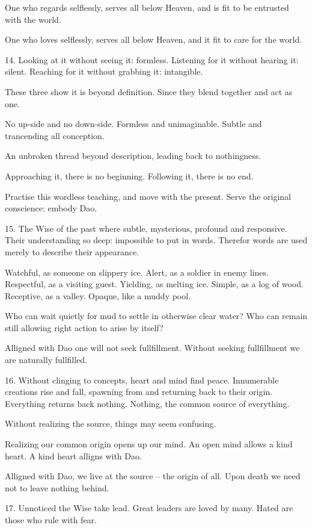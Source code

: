 \documentclass[10pt,a4paper]{book}
\begin{document}
One who regards selflessly,
serves all below Heaven,
and is fit to be entrusted with the world.

One who loves selflessly,
serves all below Heaven,
and it fit to care for the world.


14.
Looking at it without seeing it: formless.
Listening for it without hearing it: silent.
Reaching for it without grabbing it: intangible.

These three show it is beyond definition.
Since they blend together and act as one.

No up-side and no down-side.
Formless and unimaginable.
Subtle and trancending all conception.

An unbroken thread beyond description,
leading back to nothingness.

Approaching it, there is no beginning.
Following it, there is no end.

Practise this wordless teaching,
and move with the present.
Serve the original conscience: embody Dao.


15.
The Wise of the past where subtle, mysterious, profound and responsive.
Their understanding so deep: impossible to put in words.
Therefor words are used merely to describe their appearance.

Watchful, as someone on slippery ice.
Alert, as a soldier in enemy lines.
Respectful, as a visiting guest.
Yielding, as melting ice.
Simple, as a log of wood.
Receptive, as a valley.
Opaque, like a muddy pool.

Who can wait quietly for mud to settle in otherwise clear water?
Who can remain still allowing right action to arise by itself?

Alligned with Dao one will not seek fullfillment.
Without seeking fullfillment we are naturally fullfilled.


16.
Without clinging to concepts,
heart and mind find peace.
Innumerable creations rise and fall,
spawning from and returning back to their origin.
Everything returns back nothing.
Nothing, the common source of everything.

Without realizing the source,
things may seem confusing.

Realizing our common origin opens up our mind.
An open mind allows a kind heart.
A kind heart alligns with Dao.

Alligned with Dao, we live at the source -- the origin of all.
Upon death we need not to leave nothing behind.


17.
Unnoticed the Wise take lead.
Great leaders are loved by many.
Hated are those who rule with fear.
\end{document}
